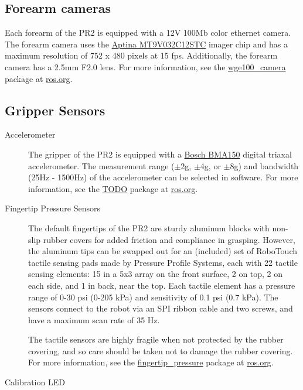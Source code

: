 \subsection{Forearm cameras}
Each forearm of the PR2 is equipped with a 12V 100Mb color ethernet camera. The
forearm camera uses the
\href{http://www.aptina.com/products/image_sensors/mt9v032c12stc/#overview}{Aptina
  MT9V032C12STC} imager chip and has a maximum resolution of 752 x 480 pixels at
15 fps. Additionally, the forearm camera has a 2.5mm F2.0 lens.  For more
information, see the
\href{http://www.ros.org/wiki/wge100_camera}{wge100\_camera} package at
\href{http://www.ros.org}{ros.org}.

\subsection{Gripper Sensors}
\begin{description}

\item[Accelerometer] The gripper of the PR2 is equipped with a
  \href{http://www.bosch-sensortec.com/content/language1/html/3474.htm}{Bosch
    BMA150} digital triaxal accelerometer. The measurement range ($\pm$2g,
  $\pm$4g, or $\pm$8g) and bandwidth (25Hz - 1500Hz) of the accelerometer can be
  selected in software. For more information, see the
  \href{http://www.ros.org/wiki/wge100_camera}{TODO} package at
  \href{http://www.ros.org}{ros.org}.

\item[Fingertip Pressure Sensors] The default fingertips of the PR2 are sturdy
  aluminum blocks with non-slip rubber covers for added friction and compliance
  in grasping.  However, the aluminum tips can be swapped out for an (included)
  set of RoboTouch tactile sensing pads made by Pressure Profile Systems, each
  with 22 tactile sensing elements: 15 in a 5x3 array on the front surface, 2 on
  top, 2 on each side, and 1 in back, near the top.  Each tactile element has a
  pressure range of 0-30 psi (0-205 kPa) and sensitivity of 0.1 psi (0.7 kPa).
  The sensors connect to the robot via an SPI ribbon cable and two screws, and
  have a maximum scan rate of 35 Hz.

The tactile sensors are highly fragile when not protected by the rubber
covering, and so care should be taken not to damage the rubber covering.  For
more information, see the
\href{http://www.ros.org/wiki/fingertip\_pressure}{fingertip\_pressure} package
at \href{http://ros.org}{ros.org}.

\item[Calibration LED]

\end{description}

